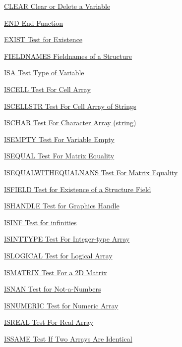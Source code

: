
\begin{DoxyItemize}
\item \hyperlink{inspection_clear}{C\-L\-E\-A\-R Clear or Delete a Variable}  
\item \hyperlink{inspection_end}{E\-N\-D End Function}  
\item \hyperlink{inspection_exist}{E\-X\-I\-S\-T Test for Existence}  
\item \hyperlink{inspection_fieldnames}{F\-I\-E\-L\-D\-N\-A\-M\-E\-S Fieldnames of a Structure}  
\item \hyperlink{inspection_isa}{I\-S\-A Test Type of Variable}  
\item \hyperlink{inspection_iscell}{I\-S\-C\-E\-L\-L Test For Cell Array}  
\item \hyperlink{inspection_iscellstr}{I\-S\-C\-E\-L\-L\-S\-T\-R Test For Cell Array of Strings}  
\item \hyperlink{inspection_ischar}{I\-S\-C\-H\-A\-R Test For Character Array (string)}  
\item \hyperlink{inspection_isempty}{I\-S\-E\-M\-P\-T\-Y Test For Variable Empty}  
\item \hyperlink{inspection_isequal}{I\-S\-E\-Q\-U\-A\-L Test For Matrix Equality}  
\item \hyperlink{inspection_isequalwithequalnans}{I\-S\-E\-Q\-U\-A\-L\-W\-I\-T\-H\-E\-Q\-U\-A\-L\-N\-A\-N\-S Test For Matrix Equality}  
\item \hyperlink{inspection_isfield}{I\-S\-F\-I\-E\-L\-D Test for Existence of a Structure Field}  
\item \hyperlink{inspection_ishandle}{I\-S\-H\-A\-N\-D\-L\-E Test for Graphics Handle}  
\item \hyperlink{inspection_isinf}{I\-S\-I\-N\-F Test for infinities}  
\item \hyperlink{inspection_isinttype}{I\-S\-I\-N\-T\-T\-Y\-P\-E Test For Integer-\/type Array}  
\item \hyperlink{inspection_islogical}{I\-S\-L\-O\-G\-I\-C\-A\-L Test for Logical Array}  
\item \hyperlink{inspection_ismatrix}{I\-S\-M\-A\-T\-R\-I\-X Test For a 2\-D Matrix}  
\item \hyperlink{inspection_isnan}{I\-S\-N\-A\-N Test for Not-\/a-\/\-Numbers}  
\item \hyperlink{inspection_isnumeric}{I\-S\-N\-U\-M\-E\-R\-I\-C Test for Numeric Array}  
\item \hyperlink{inspection_isreal}{I\-S\-R\-E\-A\-L Test For Real Array}  
\item \hyperlink{inspection_issame}{I\-S\-S\-A\-M\-E Test If Two Arrays Are Identical}  

\end{DoxyItemize}
